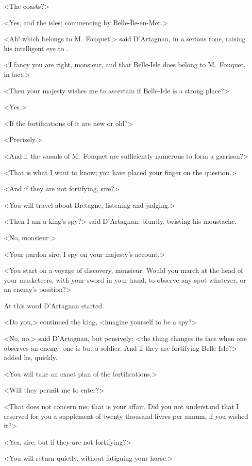 <The coasts?>

<Yes, and the isles; commencing by Belle-Île-en-Mer.>

<Ah! which belongs to M.~Fouquet!> said D'Artagnan, in a serious tone, raising his intelligent eye to .

<I fancy you are right, monsieur, and that Belle-Isle does belong to M.~Fouquet, in fact.>

<Then your majesty wishes me to ascertain if Belle-Isle is a strong place?>

<Yes.>

<If the fortifications of it are new or old?>

<Precisely.>

<And if the vassals of M.~Fouquet are sufficiently numerous to form a garrison?>

<That is what I want to know; you have placed your finger on the question.>

<And if they are not fortifying, sire?>

<You will travel about Bretagne, listening and judging.>

<Then I am a king's spy?> said D'Artagnan, bluntly, twisting his moustache.

<No, monsieur.>

<Your pardon sire; I spy on your majesty's account.>

<You start on a voyage of discovery, monsieur. Would you march at the head of your musketeers, with your sword in your hand, to observe any spot whatever, or an enemy's position?>

At this word D'Artagnan started.

<Do you,> continued the king, <imagine yourself to be a spy?>

<No, no,> said D'Artagnan, but pensively; <the thing changes its face when one observes an enemy: one is but a soldier. And if they are fortifying Belle-Isle?> added he, quickly.

<You will take an exact plan of the fortifications.>

<Will they permit me to enter?>

<That does not concern me; that is your affair. Did you not understand that I reserved for you a supplement of twenty thousand livres per annum, if you wished it?>

<Yes, sire; but if they are not fortifying?>

<You will return quietly, without fatiguing your horse.>


